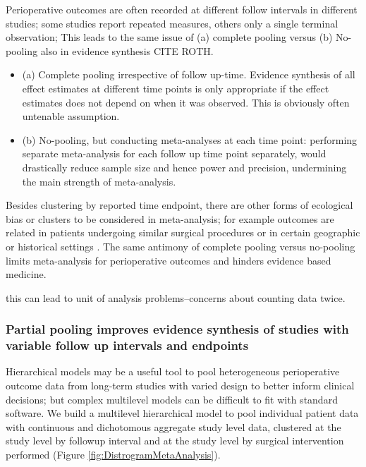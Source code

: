 \documentclass[11pt,notitlepage]{article}
\begin{document}
Perioperative outcomes are often recorded at different follow intervals in different studies; some studies report repeated measures, others only a single terminal observation; This leads to the same issue of (a) complete pooling versus (b) No-pooling also in evidence synthesis CITE ROTH.

\begin{itemize}

\item (a) Complete pooling irrespective of follow up-time.
Evidence synthesis of all effect estimates at different time points is only appropriate if the effect estimates does not depend on when it was observed. This is obviously often untenable assumption.

\item (b) No-pooling, but conducting meta-analyses at each time point: performing separate meta-analysis for each follow up time point separately, would drastically reduce sample size and hence power and precision, undermining the main strength of meta-analysis.

\end{itemize}

Besides clustering by reported time endpoint, there are other forms of ecological bias or clusters to be considered in meta-analysis; for example outcomes are related in patients undergoing similar surgical procedures or in certain geographic or historical settings  \cite{Abroug2011,Andreae2013,Andreae2015}. The same antimony of complete pooling versus no-pooling limits meta-analysis for perioperative outcomes and hinders evidence based medicine.

 this can lead to unit of analysis problems--concerns about counting data twice. 

\subsubsection*{Partial pooling improves evidence synthesis of studies with variable follow up intervals and endpoints}
 
Hierarchical models may be a useful tool to pool heterogeneous perioperative outcome data from long-term studies with varied design to better inform clinical decisions\cite{AndreaeJohnsonAbstract2013,Spiegelhalter2004bayesian}; but complex multilevel models can be difficult to fit with standard software. We build a multilevel hierarchical model to pool individual patient data with continuous and dichotomous aggregate study level data, clustered at the study level by followup interval and at the study level by surgical intervention performed (Figure \ref{fig:DistrogramMetaAnalysis}).
\end{document}
